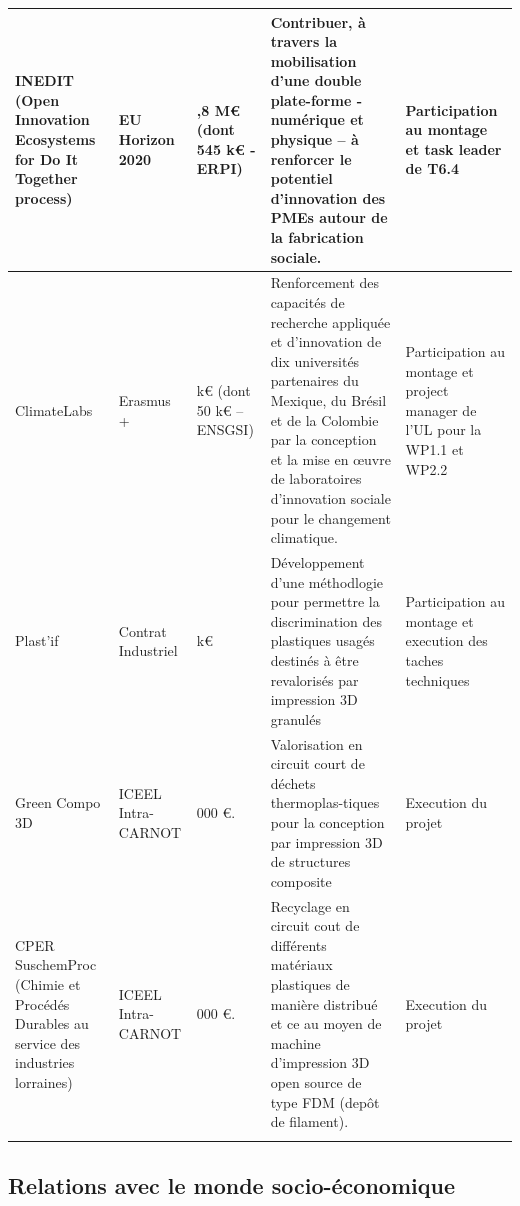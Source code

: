 \documentclass[
  11pt,
]{article}
\begin{document}
\begin{landscape}
\begin{longtable}[t]{>{\raggedright\arraybackslash}p{4cm}>{\raggedright\arraybackslash}p{3cm}>{\raggedright\arraybackslash}p{2cm}>{\raggedright\arraybackslash}p{7cm}>{\raggedright\arraybackslash}p{3cm}}
\midrule
INEDIT (Open Innovation Ecosystems for Do It Together process) & EU Horizon 2020 & 6,8 M€ (dont 545 k€ - ERPI) & Contribuer, à travers la mobilisation d’une double plate-forme - numérique et physique – à renforcer le potentiel d’innovation des PMEs autour de la fabrication sociale. & Participation au montage et task leader de T6.4\\
\midrule
ClimateLabs & Erasmus + & 956 k€ (dont 50 k€ --ENSGSI) & Renforcement des capacités de recherche appliquée et d'innovation de dix universités partenaires du Mexique, du Brésil et de la Colombie par la conception et la mise en œuvre de laboratoires d'innovation sociale pour le changement climatique. & Participation au montage et project manager de l'UL pour la WP1.1 et WP2.2\\
\midrule
Plast’if & Contrat Industriel & 11 k€ & Développement d'une méthodlogie pour permettre la discrimination des plastiques usagés destinés à être revalorisés par impression 3D granulés & Participation au montage et execution des taches techniques\\
\midrule
\addlinespace
Green Compo 3D & ICEEL Intra-CARNOT & 14 000 €. & Valorisation en circuit court de déchets thermoplas-tiques pour la conception par impression 3D de structures composite & Execution du projet\\
\midrule
CPER SuschemProc (Chimie et Procédés Durables au service des industries lorraines) & ICEEL Intra-CARNOT & 44 000 €. & Recyclage en circuit cout de différents matériaux plastiques de manière distribué et ce au moyen de machine d’impression 3D open source de type FDM (depôt de filament). & Execution du projet\\*
\end{longtable}
\endgroup{}
\end{landscape}

\hypertarget{relations-avec-le-monde-socio-uxe9conomique}{%
\subsection{Relations avec le monde
socio-économique}\label{relations-avec-le-monde-socio-uxe9conomique}}
\end{document}
